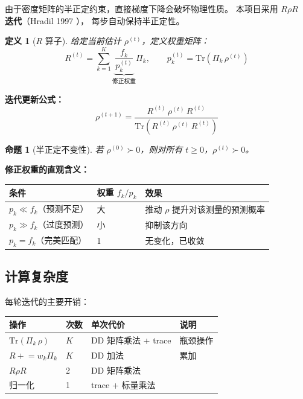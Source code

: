 \documentclass[12pt, a4paper]{article}
\newtheorem{definition}{定义}
\newtheorem{proposition}{命题}
\begin{document}
由于密度矩阵的半正定约束，直接梯度下降会破坏物理性质。
本项目采用 \textbf{$R\rho R$ 迭代}（Hradil 1997 \cite{hradil1997}），
每步自动保持半正定性。

\begin{definition}[$R$ 算子]
给定当前估计 $\rho^{(t)}$，定义权重矩阵：
\[
    R^{(t)} = \sum_{k=1}^{K}
    \underbrace{\frac{f_k}{p_k^{(t)}}}_{\text{修正权重}}
    \Pi_k,
    \qquad
    p_k^{(t)} = \mathrm{Tr}\!\left(\Pi_k\,\rho^{(t)}\right)
\]
\end{definition}

\textbf{迭代更新公式：}
\[
    \boxed{
        \rho^{(t+1)} = \frac{R^{(t)}\,\rho^{(t)}\,R^{(t)}}
        {\mathrm{Tr}\!\left(R^{(t)}\,\rho^{(t)}\,R^{(t)}\right)}
    }
\]

\begin{proposition}[半正定不变性]
若 $\rho^{(0)} \succ 0$，则对所有 $t \geq 0$，$\rho^{(t)} \succ 0$。
\end{proposition}

\textbf{修正权重的直观含义：}

\begin{center}
\begin{tabular}{lll}
\toprule
条件 & 权重 $f_k/p_k$ & 效果 \\
\midrule
$p_k \ll f_k$（预测不足） & 大 & 推动 $\rho$ 提升对该测量的预测概率 \\
$p_k \gg f_k$（过度预测） & 小 & 抑制该方向 \\
$p_k = f_k$（完美匹配） & 1 & 无变化，已收敛 \\
\bottomrule
\end{tabular}
\end{center}

\subsection{计算复杂度}

每轮迭代的主要开销：

\begin{center}
\begin{tabular}{llll}
\toprule
操作 & 次数 & 单次代价 & 说明 \\
\midrule
$\mathrm{Tr}(\Pi_k\,\rho)$ & $K$ & DD 矩阵乘法 + trace & 瓶颈操作 \\
$R \mathrel{+}= w_k \Pi_k$ & $K$ & DD 加法 & 累加 \\
$R\rho R$ & 2 & DD 矩阵乘法 & \\
归一化 & 1 & trace + 标量乘法 & \\
\bottomrule
\end{tabular}
\end{center}
\end{document}
